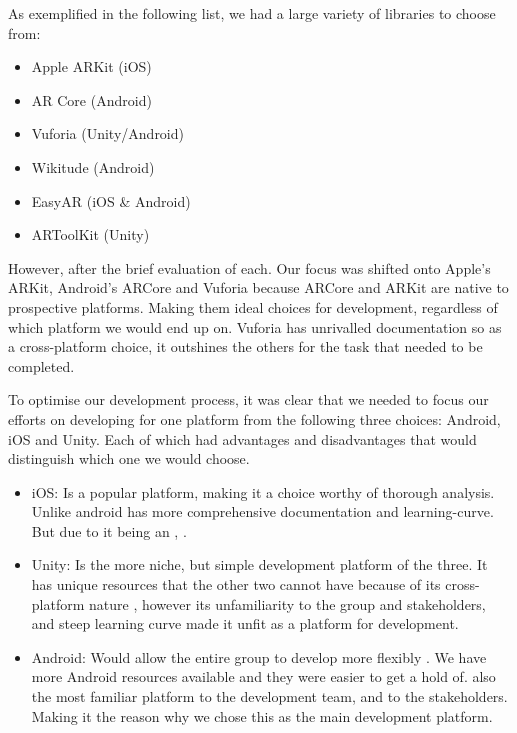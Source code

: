 As exemplified in the following list,  we had a large variety of libraries to choose from: 
\begin{itemize}
    \item Apple ARKit (iOS)
    \item AR Core (Android)
    \item Vuforia (Unity/Android)
    \item Wikitude (Android)
    \item EasyAR (iOS \& Android)
    \item ARToolKit (Unity)
\end{itemize}
However, after the brief evaluation of each. Our focus was shifted onto  Apple's ARKit, Android's ARCore and Vuforia because ARCore and ARKit are native to  prospective platforms. Making them ideal choices for development, regardless of which platform we would end up on. Vuforia has unrivalled documentation so as a cross-platform choice, it outshines the others for the task that needed to be completed. 

To optimise our development process, it was clear that  we needed to focus our efforts on developing for one platform from the following three choices: Android, iOS and Unity. Each of which had advantages and disadvantages that would distinguish which one we would choose.

\begin{itemize}
    \item iOS: Is a popular platform, making it a choice worthy of thorough analysis. Unlike android has more comprehensive documentation and  learning-curve. But due to it being an , . 
    \item Unity: Is the more niche, but simple development platform of the three. It has unique resources that the other two cannot have because of its cross-platform nature , however its unfamiliarity to the group and stakeholders, and steep learning curve made it unfit as a platform for development.
    \item Android: Would allow the entire group to develop more flexibly . We have more Android resources available and they were easier to get a hold of.  also the most familiar platform to the development team, and to the stakeholders. Making it the reason why we chose this as the main development platform.
\end{itemize}


